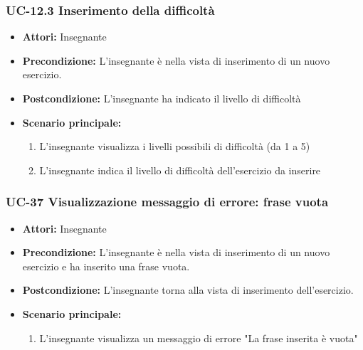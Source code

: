 \subsubsection{UC-12.3 Inserimento della difficoltà}
\begin{itemize}
	\item \textbf{Attori: }Insegnante
	\item \textbf{Precondizione:} L'insegnante è nella vista di inserimento di un nuovo esercizio.
	\item \textbf{Postcondizione:} L'insegnante ha indicato il livello di difficoltà
	\item \textbf{Scenario principale:}
	\begin{enumerate}
		\item L'insegnante visualizza i livelli possibili di difficoltà (da 1 a 5)
		\item L'insegnante indica il livello di difficoltà dell'esercizio da inserire
	\end{enumerate}
\end{itemize}

\subsubsection{UC-37 Visualizzazione messaggio di errore: frase vuota}
\begin{itemize}
	\item \textbf{Attori:} Insegnante
	\item \textbf{Precondizione:} L'insegnante è nella vista di inserimento di un nuovo esercizio e ha inserito una frase vuota.
	\item \textbf{Postcondizione:} L'insegnante torna alla vista di inserimento dell'esercizio.
	\item \textbf{Scenario principale:}
	\begin{enumerate}
		\item L'insegnante visualizza un messaggio di errore "La frase inserita è vuota"
	\end{enumerate}
\end{itemize}

